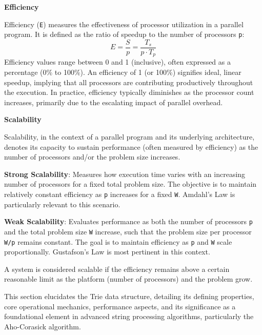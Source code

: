 \textbf{Efficiency}

Efficiency (\texttt{E}) measures the effectiveness of processor utilization in a parallel program. It is defined as the ratio of speedup to the number of processors \texttt{p}:
\[ E = \frac{S}{p} = \frac{T_s}{p \cdot T_p} \]
Efficiency values range between 0 and 1 (inclusive), often expressed as a percentage (0\% to 100\%). An efficiency of 1 (or 100\%) signifies ideal, linear speedup, implying that all processors are contributing productively throughout the execution. In practice, efficiency typically diminishes as the processor count increases, primarily due to the escalating impact of parallel overhead.

\textbf{Scalability}

Scalability, in the context of a parallel program and its underlying architecture, denotes its capacity to sustain performance (often measured by efficiency) as the number of processors and/or the problem size increases.

\textbf{Strong Scalability}: Measures how execution time varies with an increasing number of processors for a fixed total problem size. The objective is to maintain relatively constant efficiency as \texttt{p} increases for a fixed \texttt{W}. Amdahl's Law is particularly relevant to this scenario.

\textbf{Weak Scalability}: Evaluates performance as both the number of processors \texttt{p} and the total problem size \texttt{W} increase, such that the problem size per processor \texttt{W/p} remains constant. The goal is to maintain efficiency as \texttt{p} and \texttt{W} scale proportionally. Gustafson's Law is most pertinent in this context.

A system is considered scalable if the efficiency remains above a certain reasonable limit as the platform (number of processors) and the problem grow.






This section elucidates the Trie data structure, detailing its defining properties, core operational mechanics, performance aspects, and its significance as a foundational element in advanced string processing algorithms, particularly the Aho-Corasick algorithm.

